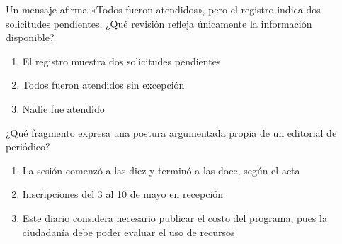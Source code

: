 \noindent\begin{minipage}{\linewidth}\setlength{\parskip}{4pt}\label{q:E-029}
Un mensaje afirma «Todos fueron atendidos», pero el registro indica dos solicitudes pendientes. ¿Qué revisión refleja únicamente la información disponible?
\begin{enumerate}[label=\Alph*),nosep]
\item El registro muestra dos solicitudes pendientes
\item Todos fueron atendidos sin excepción
\item Nadie fue atendido
\end{enumerate}\end{minipage}\par\medskip

\noindent\begin{minipage}{\linewidth}\setlength{\parskip}{4pt}\label{q:E-030}
¿Qué fragmento expresa una postura argumentada propia de un editorial de periódico?
\begin{enumerate}[label=\Alph*),nosep]
\item La sesión comenzó a las diez y terminó a las doce, según el acta
\item Inscripciones del 3 al 10 de mayo en recepción
\item Este diario considera necesario publicar el costo del programa, pues la ciudadanía debe poder evaluar el uso de recursos
\end{enumerate}\end{minipage}\par\medskip